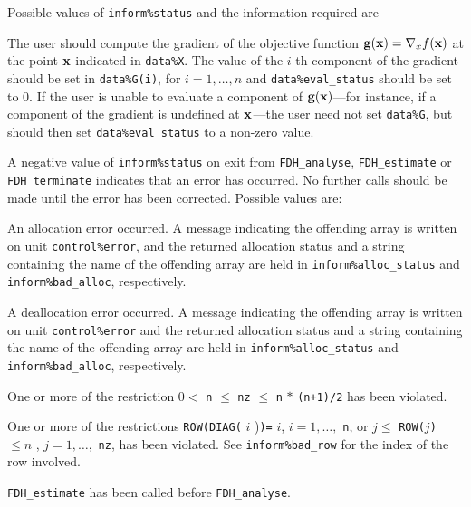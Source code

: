 \documentclass{galahad}
\newcommand{\packagename}{FDH}
\begin{document}
Possible values of {\tt inform\%status} and the information required are
\begin{description}
 The user should compute the gradient
     of the objective function ${\mathbf{g}}({\mathbf{x}}) = \nabla_x f({\mathbf{x}})$ at the
     point ${\mathbf{x}}$ indicated in {\tt data\%X}.
     The value of the $i$-th component of the gradient should be set
     in {\tt data\%G(i)},      for $i = 1, \ldots, n$ and
     {\tt data\%eval\_status} should be set to 0. If the user is
     unable to evaluate a component of ${\mathbf{g}}({\mathbf{x}})$---for instance,
     if a component of the gradient is
     undefined at ${\mathbf{x}}$---the user need not set {\tt data\%G}, but
     should then set {\tt data\%eval\_status} to a non-zero value.
\end{description}



\galerrors
A negative value of {\tt inform\%status} on exit from
{\tt \packagename\_analyse},
{\tt \packagename\_estimate}
or
{\tt \packagename\_terminate}
indicates that an error has occurred. No further calls should be made
until the error has been corrected. Possible values are:

\begin{description}

 An allocation error occurred.
A message indicating the offending
array is written on unit {\tt control\%error}, and the returned allocation
status and a string containing the name of the offending array
are held in {\tt inform\%alloc\_\-status}
and {\tt inform\%bad\_alloc}, respectively.

 A deallocation error occurred.
A message indicating the offending
array is written on unit {\tt control\%error} and the returned allocation
status and a string containing the name of the offending array
are held in {\tt inform\%alloc\_\-status}
and {\tt inform\%bad\_alloc}, respectively.

 One or more of the restriction
$0 <$ {\tt n} $\le$ {\tt nz} $\le$ {\tt n} $\ast$ {\tt (n+1)/2}
  has been violated.

 One or more of the restrictions
{\tt ROW(DIAG(} $i$ {)\tt)=} $i$, $i = 1, \ldots,$ {\tt n}, or
$j \leq$ {\tt ROW(}$j${\tt)} $\leq n$ , $j = 1, \ldots,$ {\tt nz},
  has been violated. See {\tt inform\%bad\_row}
for the index of the row involved.

  {\tt \packagename\_estimate} has been called
before {\tt \packagename\_analyse}.

\end{description}
\end{document}
